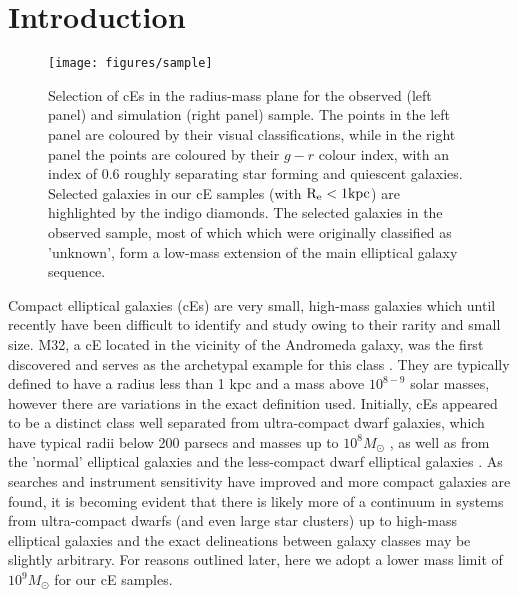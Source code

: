 \documentclass[a4paper,fleqn,usenatbib]{mnras}
\begin{document}


\section{Introduction}
\label{introduction}


\begin{figure*}
\texttt{[image: figures/sample]}
   \caption{Selection of cEs in the radius-mass plane for the observed (left panel) and simulation (right panel) sample. The points in the left panel are coloured by their visual classifications, while in the right panel the points are coloured by their $g-r$ colour index, with an index of 0.6 roughly separating star forming and quiescent galaxies. Selected galaxies in our cE samples (with ${\rm R_{e} < 1 kpc}$) are highlighted by the indigo diamonds. The selected galaxies in the observed sample, most of which which were originally classified as 'unknown', form a low-mass extension of the main elliptical galaxy sequence.}
 \label{sample}
 \end{figure*}


Compact elliptical galaxies (cEs) are very small, high-mass galaxies which until recently have been difficult to identify and study owing to their rarity and small size. M32, a cE located in the vicinity of the Andromeda galaxy, was the first discovered and serves as the archetypal example for this class \citep{1973ApJ...179..731F}. They are typically defined to have a radius less than 1 kpc and a mass above $10^{8-9}$ solar masses, however there are variations in the exact definition used. Initially, cEs appeared to be a distinct class well separated from ultra-compact dwarf galaxies, which have typical radii below 200 parsecs and masses up to $10^{8} M_{\odot}$ \citep{2003Natur.423..519D,2017A&A...608A..53J}, as well as from the 'normal' elliptical galaxies and the less-compact dwarf elliptical galaxies \citep{2011MNRAS.414.3699M}. As searches and instrument sensitivity have improved and more compact galaxies are found, it is becoming evident that there is likely more of a continuum in systems from ultra-compact dwarfs (and even large star clusters) up to high-mass elliptical galaxies \citep{2011MNRAS.414.3699M,2014MNRAS.443.1151N} and the exact delineations between galaxy classes may be slightly arbitrary. For reasons outlined later, here we adopt a lower mass limit of $10^{9}M_{\odot}$ for our cE samples.
\end{document}
